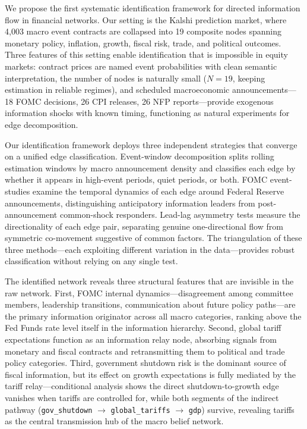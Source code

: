 \documentclass[12pt,letterpaper]{article}
\begin{document}
We propose the first systematic identification framework for directed information flow in financial networks. Our setting is the Kalshi prediction market, where 4,003 macro event contracts are collapsed into 19 composite nodes spanning monetary policy, inflation, growth, fiscal risk, trade, and political outcomes. Three features of this setting enable identification that is impossible in equity markets: contract prices are named event probabilities with clean semantic interpretation, the number of nodes is naturally small ($N=19$, keeping estimation in reliable regimes), and scheduled macroeconomic announcements---18 FOMC decisions, 26 CPI releases, 26 NFP reports---provide exogenous information shocks with known timing, functioning as natural experiments for edge decomposition.

Our identification framework deploys three independent strategies that converge on a unified edge classification. Event-window decomposition splits rolling estimation windows by macro announcement density and classifies each edge by whether it appears in high-event periods, quiet periods, or both. FOMC event-studies examine the temporal dynamics of each edge around Federal Reserve announcements, distinguishing anticipatory information leaders from post-announcement common-shock responders. Lead-lag asymmetry tests measure the directionality of each edge pair, separating genuine one-directional flow from symmetric co-movement suggestive of common factors. The triangulation of these three methods---each exploiting different variation in the data---provides robust classification without relying on any single test.

The identified network reveals three structural features that are invisible in the raw network. First, FOMC internal dynamics---disagreement among committee members, leadership transitions, communication about future policy paths---are the primary information originator across all macro categories, ranking above the Fed Funds rate level itself in the information hierarchy. Second, global tariff expectations function as an information relay node, absorbing signals from monetary and fiscal contracts and retransmitting them to political and trade policy categories. Third, government shutdown risk is the dominant source of fiscal information, but its effect on growth expectations is fully mediated by the tariff relay---conditional analysis shows the direct shutdown-to-growth edge vanishes when tariffs are controlled for, while both segments of the indirect pathway (\texttt{gov\_shutdown} $\to$ \texttt{global\_tariffs} $\to$ \texttt{gdp}) survive, revealing tariffs as the central transmission hub of the macro belief network.
\end{document}
